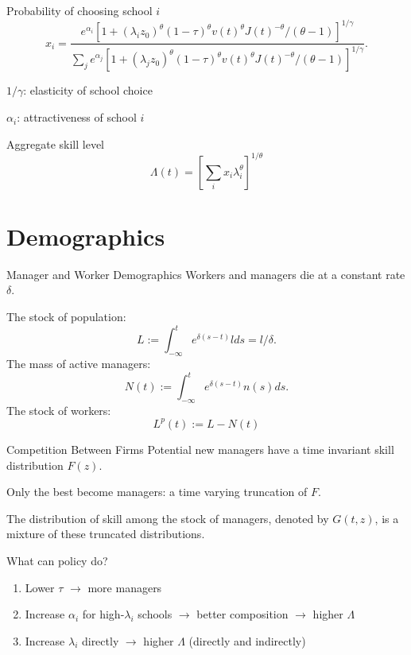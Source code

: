 \documentclass[
  ignorenonframetext,
  aspectratio=1610,
]{beamer}
\providecommand{\tightlist}{%
  \setlength{\itemsep}{0pt}\setlength{\parskip}{0pt}}
\begin{document}
\begin{frame}{Probability of choosing school \(i\)}
\protect\hypertarget{probability-of-choosing-school-i}{}
\[
x_i = \frac {e^{\alpha_i} \left[
1 + (\lambda_i z_0)^\theta (1-\tau)^{\theta} v(t)^\theta J(t)^{-\theta}/(\theta-1)
\right]^{1/\gamma}   } 
{\sum_j e^{\alpha_j}\left[
1 + (\lambda_j z_0)^\theta (1-\tau)^{\theta} v(t)^\theta J(t)^{-\theta}/(\theta-1)
\right]^{1/\gamma}   }.
\]

\(1/\gamma\): elasticity of school choice

\(\alpha_i\): attractiveness of school \(i\)
\end{frame}

\begin{frame}{Aggregate skill level}
\protect\hypertarget{aggregate-skill-level}{}
\[
\Lambda(t) = \left[\sum_i x_i \lambda_i^\theta \right]^{1/\theta}
\]
\end{frame}

\section{Demographics}\label{demographics}

\begin{frame}{Manager and Worker Demographics}
\protect\hypertarget{manager-and-worker-demographics}{}
Workers and managers die at a constant rate \(\delta\).

The stock of population: \[
L := \int_{-\infty}^t e^{\delta{(s-t)}}l ds = l/\delta.
\] The mass of active managers: \[
N(t) := \int_{-\infty}^t e^{\delta{(s-t)}}n(s) ds.
\] The stock of workers: \[L^{p} (t) := L-N(t)\]
\end{frame}

\begin{frame}{Competition Between Firms}
\protect\hypertarget{competition-between-firms}{}
Potential new managers have a time invariant skill distribution
\(F(z)\).

Only the best become managers: a time varying truncation of \(F\).

The distribution of skill among the stock of managers, denoted by
\(G(t, z)\), is a mixture of these truncated distributions.
\end{frame}

\begin{frame}{What can policy do?}
\protect\hypertarget{what-can-policy-do}{}
\begin{enumerate}
\tightlist
\item
  Lower \(\tau\) \(\to\) more managers
\item
  Increase \(\alpha_i\) for high-\(\lambda_i\) schools \(\to\) better
  composition \(\to\) higher \(\Lambda\)
\item
  Increase \(\lambda_i\) directly \(\to\) higher \(\Lambda\) (directly
  and indirectly)
\end{enumerate}
\end{frame}
\end{document}
